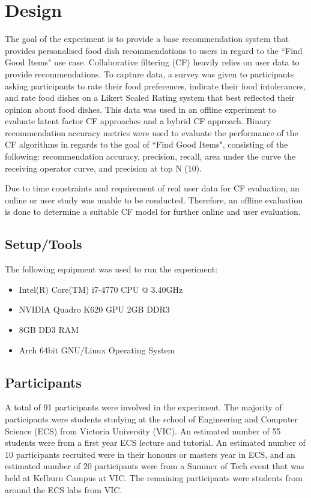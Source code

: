 \section{Design}

The goal of the experiment is to provide a base recommendation system that provides personalised food dish recommendations to users in regard to the ``Find Good Items" use case. Collaborative filtering (CF) heavily relies on user data to provide recommendations. To capture data, a survey was given to participants asking participants to rate their food preferences, indicate their food intolerances, and rate food dishes on a Likert Scaled Rating system that best reflected their opinion about food dishes. This data was used in an offline experiment to evaluate latent factor CF approaches and a hybrid CF approach. Binary recommendation accuracy metrics were used to evaluate the performance of the CF algorithms in regards to the goal of ``Find Good Items", consisting of the following: recommendation accuracy, precision, recall, area under the curve the receiving operator curve, and precision at top N (10). 

Due to time constraints and requirement of real user data for CF evaluation, an online or user study was unable to be conducted. Therefore, an offline evaluation is done to determine a suitable CF model for further online and user evaluation. 


\subsection{Setup/Tools}
The following equipment was used to run the experiment:
\begin{itemize}
     \item{Intel(R) Core(TM) i7-4770 CPU @ 3.40GHz}
     \item{NVIDIA Quadro K620 GPU 2GB DDR3}
     \item{8GB DD3 RAM}
     \item{Arch 64bit GNU/Linux Operating System}
\end{itemize}

\subsection{Participants}

A total of 91 participants were involved in the experiment. The majority of participants were students studying at the school of Engineering and Computer Science (ECS) from Victoria University (VIC). An estimated number of 55 students were from a first year ECS lecture and tutorial. An estimated number of 10 participants recruited were in their honours or masters year in ECS, and an estimated number of 20 participants were from a Summer of Tech event that was held at Kelburn Campus at VIC. The remaining participants were students from around the ECS labs from VIC.

